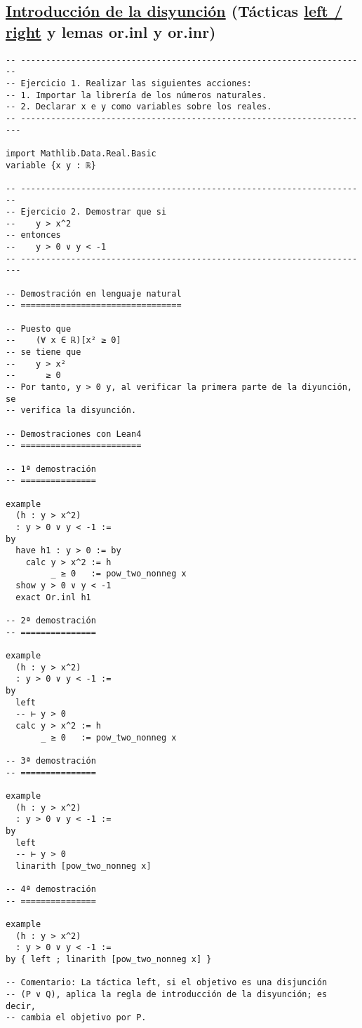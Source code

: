 \subsection{\href{./src/Logica/Introduccion\_de\_la\_disyuncion.lean}{Introducción de la disyunción} (Tácticas \href{https://bit.ly/3enkT3d}{left / right} y lemas or.inl y or.inr)}
\label{sec:org948f507}
\begin{verbatim}
-- ---------------------------------------------------------------------
-- Ejercicio 1. Realizar las siguientes acciones:
-- 1. Importar la librería de los números naturales.
-- 2. Declarar x e y como variables sobre los reales.
-- ----------------------------------------------------------------------

import Mathlib.Data.Real.Basic
variable {x y : ℝ}

-- ---------------------------------------------------------------------
-- Ejercicio 2. Demostrar que si
--    y > x^2
-- entonces
--    y > 0 ∨ y < -1
-- ----------------------------------------------------------------------

-- Demostración en lenguaje natural
-- ================================

-- Puesto que
--    (∀ x ∈ ℝ)[x² ≥ 0]
-- se tiene que
--    y > x²
--      ≥ 0
-- Por tanto, y > 0 y, al verificar la primera parte de la diyunción, se
-- verifica la disyunción.

-- Demostraciones con Lean4
-- ========================

-- 1ª demostración
-- ===============

example
  (h : y > x^2)
  : y > 0 ∨ y < -1 :=
by
  have h1 : y > 0 := by
    calc y > x^2 := h
         _ ≥ 0   := pow_two_nonneg x
  show y > 0 ∨ y < -1
  exact Or.inl h1

-- 2ª demostración
-- ===============

example
  (h : y > x^2)
  : y > 0 ∨ y < -1 :=
by
  left
  -- ⊢ y > 0
  calc y > x^2 := h
       _ ≥ 0   := pow_two_nonneg x

-- 3ª demostración
-- ===============

example
  (h : y > x^2)
  : y > 0 ∨ y < -1 :=
by
  left
  -- ⊢ y > 0
  linarith [pow_two_nonneg x]

-- 4ª demostración
-- ===============

example
  (h : y > x^2)
  : y > 0 ∨ y < -1 :=
by { left ; linarith [pow_two_nonneg x] }

-- Comentario: La táctica left, si el objetivo es una disjunción
-- (P ∨ Q), aplica la regla de introducción de la disyunción; es decir,
-- cambia el objetivo por P.


\end{verbatim}
